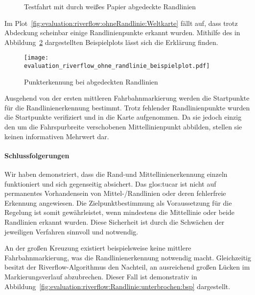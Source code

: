 \begin{figure}[htbp] %
	\hfill
	\label{fig:evaluation:riverflow:ohneRandlinie}
	\caption{Testfahrt mit durch weißes Papier abgedeckte Randlinien}
\end{figure}

Im Plot~\ref{fig:evaluation:riverflow:ohneRandlinie:Weltkarte} fällt auf, dass trotz Abdeckung scheinbar einige Randlinienpunkte erkannt wurden. Mithilfe des in Abbildung~\ref{fig:evaluation:riverflow:ohneMittellinie:bspPlot} dargestellten Beispielplots lässt sich die Erklärung finden.

\begin{figure}[htbp] %
	\centering
	\texttt{[image: evaluation\_riverflow\_ohne\_randlinie\_beispielplot.pdf]}
	\label{fig:evaluation:riverflow:ohneMittellinie:bspPlot}
	\caption{Punkterkennung bei abgedeckten Randlinien}
\end{figure}

Ausgehend von der ersten mittleren Fahrbahnmarkierung werden die Startpunkte für die Randlinienerkennung bestimmt. Trotz fehlender Randlinienpunkte wurden die Startpunkte verifiziert und in die Karte aufgenommen. Da sie jedoch einzig den um die Fahrspurbreite verschobenen Mittellinienpunkt abbilden, stellen sie keinen informativen Mehrwert dar.

\paragraph{Schlussfolgerungen}

Wir haben demonstriert, dass die Rand-und Mittellinienerkennung einzeln funktioniert und sich gegenseitig absichert. Das \gls{glos:tucar} ist nicht auf permanentes Vorhandensein von Mittel-/Randlinien oder deren fehlerfreie Erkennung angewiesen.
Die Zielpunktbestimmung als Voraussetzung für die Regelung ist somit gewährleistet, wenn mindestens die Mittellinie oder beide Randlinien erkannt wurden. Diese Sicherheit ist durch die Schwächen der jeweiligen Verfahren sinnvoll und notwendig. 

An der großen Kreuzung existiert beispielsweise keine mittlere Fahrbahnmarkierung, was die Randlinienerkennung notwendig macht. Gleichzeitig besitzt der Riverflow-Algorithmus den Nachteil, an ausreichend großen Lücken im Markierungsverlauf abzubrechen. Dieser Fall ist demonstrativ in Abbildung~\ref{fig:evaluation:riverflow:Randlinie:unterbrochen:bsp} dargestellt. 

